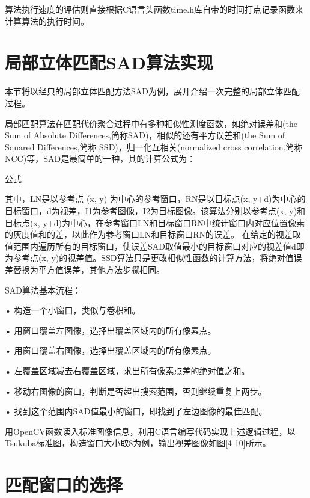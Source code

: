 算法执行速度的评估则直接根据C语言头函数time.h库自带的时间打点记录函数来计算算法的执行时间。

\section{局部立体匹配SAD算法实现}

本节将以经典的局部立体匹配方法SAD为例，展开介绍一次完整的局部立体匹配过程。


局部匹配算法在匹配代价聚合过程中有多种相似性测度函数，如绝对误差和(the Sum of Absolute Differences,简称SAD)，相似的还有平方误差和(the Sum of Squared Differences,简称 SSD)，归一化互相关(normalized cross correlation,简称 NCC)等，SAD是最简单的一种，其的计算公式为：

{{{公式}}}

其中，LN是以参考点 (x, y) 为中心的参考窗口，RN是以目标点(x, y+d)为中心的目标窗口，d为视差，I1为参考图像，I2为目标图像。该算法分别以参考点(x, y)和目标点(x, y+d)为中心，在参考窗口LN和目标窗口RN中统计窗口内对应位置像素的灰度值和的差，以此作为参考窗口LN和目标窗口RN的误差。
在给定的视差取值范围内遍历所有的目标窗口，使误差SAD取值最小的目标窗口对应的视差值d即为参考点(x, y)的视差值。SSD算法只是更改相似性函数的计算方法，将绝对值误差替换为平方值误差，其他方法步骤相同。


SAD算法基本流程：

•  构造一个小窗口，类似与卷积和。

•  用窗口覆盖左图像，选择出覆盖区域内的所有像素点。 

•  用窗口覆盖右图像，选择出覆盖区域内的所有像素点。

•  左覆盖区域减去右覆盖区域，求出所有像素点差的绝对值之和。

•  移动右图像的窗口，判断是否超出搜索范围，否则继续重复上两步。

•  找到这个范围内SAD值最小的窗口，即找到了左边图像的最佳匹配。

用OpenCV函数读入标准图像信息，利用C语言编写代码实现上述逻辑过程，以Tsukuba标准图，构造窗口大小取8为例，输出视差图像如图\ref{4-10}所示。


\section{匹配窗口的选择}

